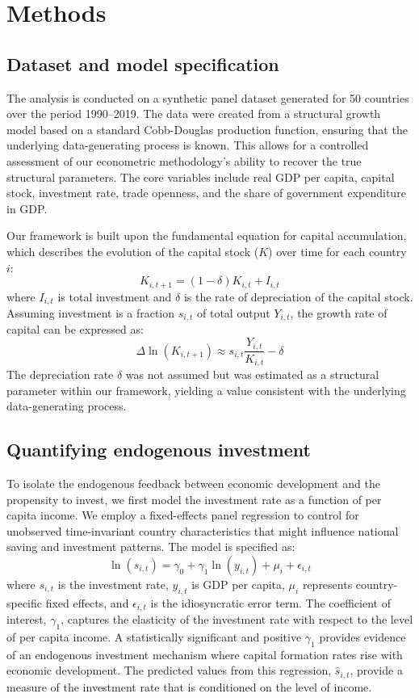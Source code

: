 \documentclass[]{article}
\begin{document}
\section{Methods}
\label{sec:methods}
\subsection{Dataset and model specification}
The analysis is conducted on a synthetic panel dataset generated for 50 countries over the period 1990--2019. The data were created from a structural growth model based on a standard Cobb-Douglas production function, ensuring that the underlying data-generating process is known. This allows for a controlled assessment of our econometric methodology's ability to recover the true structural parameters. The core variables include real GDP per capita, capital stock, investment rate, trade openness, and the share of government expenditure in GDP.

Our framework is built upon the fundamental equation for capital accumulation, which describes the evolution of the capital stock ($K$) over time for each country $i$:
\begin{equation}
K_{i,t+1} = (1-\delta)K_{i,t} + I_{i,t}
\end{equation}
where $I_{i,t}$ is total investment and $\delta$ is the rate of depreciation of the capital stock. Assuming investment is a fraction $s_{i,t}$ of total output $Y_{i,t}$, the growth rate of capital can be expressed as:
\begin{equation}
\Delta \ln(K_{i,t+1}) \approx s_{i,t} \frac{Y_{i,t}}{K_{i,t}} - \delta
\end{equation}
The depreciation rate $\delta$ was not assumed but was estimated as a structural parameter within our framework, yielding a value consistent with the underlying data-generating process.

\subsection{Quantifying endogenous investment}
To isolate the endogenous feedback between economic development and the propensity to invest, we first model the investment rate as a function of per capita income. We employ a fixed-effects panel regression to control for unobserved time-invariant country characteristics that might influence national saving and investment patterns. The model is specified as:
\begin{equation}
\ln(s_{i,t}) = \gamma_0 + \gamma_1 \ln(y_{i,t}) + \mu_i + \epsilon_{i,t}
\end{equation}
where $s_{i,t}$ is the investment rate, $y_{i,t}$ is GDP per capita, $\mu_i$ represents country-specific fixed effects, and $\epsilon_{i,t}$ is the idiosyncratic error term. The coefficient of interest, $\gamma_1$, captures the elasticity of the investment rate with respect to the level of per capita income. A statistically significant and positive $\gamma_1$ provides evidence of an endogenous investment mechanism where capital formation rates rise with economic development. The predicted values from this regression, $\hat{s}_{i,t}$, provide a measure of the investment rate that is conditioned on the level of income.
\end{document}
